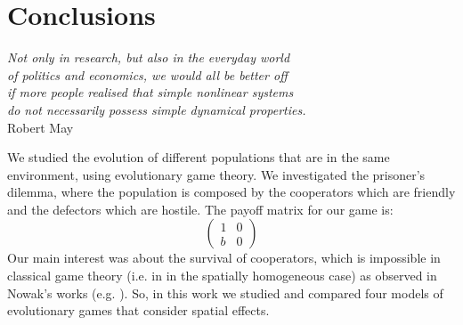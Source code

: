 
\part*{Conclusions}
\noindent \begin{flushright}
\textit{Not only in research, but also in the everyday world}\\
\textit{ of politics and economics, we would all be better off}\\
\textit{ if more people realised that simple nonlinear systems}\\
\textit{ do not necessarily possess simple dynamical properties.}\\
Robert May
\par\end{flushright}

We studied the evolution of different populations that are in the
same environment, using evolutionary game theory. We investigated
the prisoner's dilemma, where the population is composed by the cooperators
which are friendly and the defectors which are hostile. The payoff
matrix for our game is:
\[
\left(\begin{array}{cc}
1 & 0\\
b & 0
\end{array}\right)
\]
Our main interest was about the survival of cooperators, which is
impossible in classical game theory (i.e. in in the spatially homogeneous
case) as observed in Nowak's works (e.g. \cite{nowak_evolutionary_1992,nowak_more_1994,nowak_spatial_1993,nowak_spatial_1994}).
So, in this work we studied and compared four models of evolutionary
games that consider spatial effects. 
